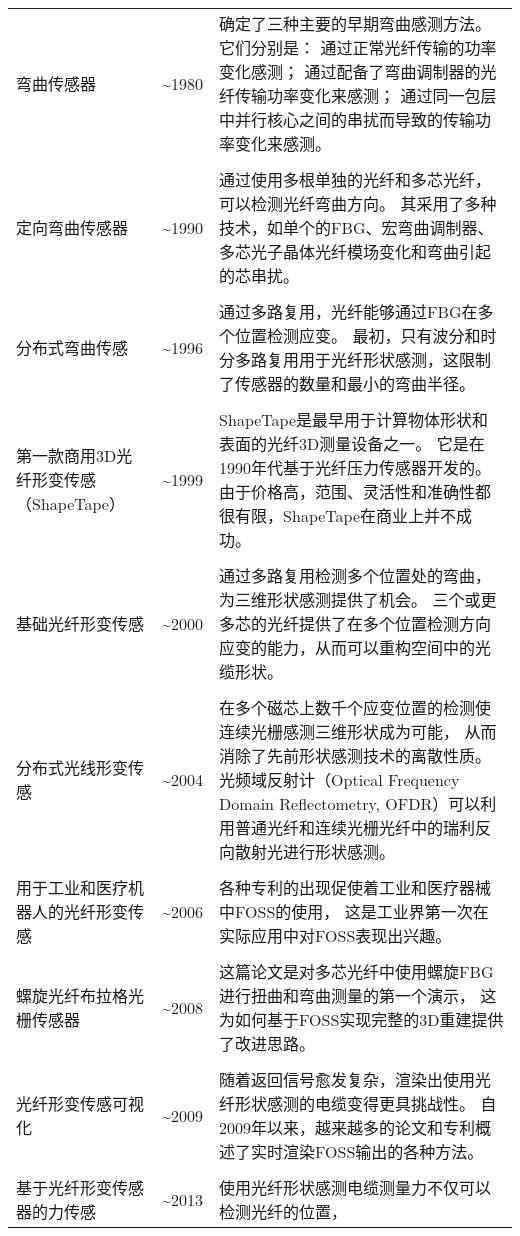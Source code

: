 \begin{table}
\begin{center}
\begin{tabular}{p{}cp{}}
弯曲传感器 & \textasciitilde 1980 & 确定了三种主要的早期弯曲感测方法。它们分别是：
通过正常光纤传输的功率变化感测；
通过配备了弯曲调制器的光纤传输功率变化来感测；
通过同一包层中并行核心之间的串扰而导致的传输功率变化来感测。
\\
\\
定向弯曲传感器 & \textasciitilde 1990 & 通过使用多根单独的光纤和多芯光纤，可以检测光纤弯曲方向。
其采用了多种技术，如单个的FBG、宏弯曲调制器、多芯光子晶体光纤模场变化和弯曲引起的芯串扰。
\\
\\
分布式弯曲传感 & \textasciitilde 1996 & 通过多路复用，光纤能够通过FBG在多个位置检测应变。 
最初，只有波分和时分多路复用用于光纤形状感测，这限制了传感器的数量和最小的弯曲半径。
\\
\\
第一款商用3D光纤形变传感（ShapeTape）& \textasciitilde 1999 & ShapeTape是最早用于计算物体形状和表面的光纤3D测量设备之一。 
它是在1990年代基于光纤压力传感器开发的。 
由于价格高，范围、灵活性和准确性都很有限，ShapeTape在商业上并不成功。
\\
\\
基础光纤形变传感 & \textasciitilde 2000 & 通过多路复用检测多个位置处的弯曲，为三维形状感测提供了机会。
三个或更多芯的光纤提供了在多个位置检测方向应变的能力，从而可以重构空间中的光缆形状。
\\
\\
分布式光线形变传感 & \textasciitilde 2004 & 在多个磁芯上数千个应变位置的检测使连续光栅感测三维形状成为可能，
从而消除了先前形状感测技术的离散性质。 
光频域反射计（Optical Frequency Domain Reflectometry, OFDR）可以利用普通光纤和连续光栅光纤中的瑞利反向散射光进行形状感测。
\\
\\
用于工业和医疗机器人的光纤形变传感 & \textasciitilde 2006 & 各种专利的出现促使着工业和医疗器械中FOSS的使用，
这是工业界第一次在实际应用中对FOSS表现出兴趣。
\\
\\
螺旋光纤布拉格光栅传感器 & \textasciitilde 2008 & 这篇论文是对多芯光纤中使用螺旋FBG进行扭曲和弯曲测量的第一个演示，
这为如何基于FOSS实现完整的3D重建提供了改进思路。
\\
\\
光纤形变传感可视化 & \textasciitilde 2009 & 随着返回信号愈发复杂，渲染出使用光纤形状感测的电缆变得更具挑战性。
自2009年以来，越来越多的论文和专利概述了实时渲染FOSS输出的各种方法。
\\
\\
基于光纤形变传感器的力传感 & \textasciitilde 2013 & 使用光纤形状感测电缆测量力不仅可以检测光纤的位置，

\end{tabular}
\end{center}
\end{table}
